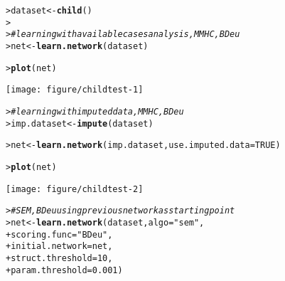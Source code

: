 \documentclass{article}\usepackage[]{graphicx}\usepackage[]{color}
\makeatletter
\def\maxwidth{ %
  \ifdim\Gin@nat@width>\linewidth
    \linewidth
  \else
    \Gin@nat@width
  \fi
}
\newcommand{\hlnum}[1]{\textcolor[rgb]{0.686,0.059,0.569}{#1}}%
\newcommand{\hlstr}[1]{\textcolor[rgb]{0.192,0.494,0.8}{#1}}%
\newcommand{\hlcom}[1]{\textcolor[rgb]{0.678,0.584,0.686}{\textit{#1}}}%
\newcommand{\hlstd}[1]{\textcolor[rgb]{0.345,0.345,0.345}{#1}}%
\newcommand{\hlkwb}[1]{\textcolor[rgb]{0.69,0.353,0.396}{#1}}%
\newcommand{\hlkwc}[1]{\textcolor[rgb]{0.333,0.667,0.333}{#1}}%
\newcommand{\hlkwd}[1]{\textcolor[rgb]{0.737,0.353,0.396}{\textbf{#1}}}%
\newenvironment{kframe}{%
 \def\at@end@of@kframe{}%
 \ifinner\ifhmode%
  \def\at@end@of@kframe{\end{minipage}}%
  \begin{minipage}{\columnwidth}%
 \fi\fi%
 \def\FrameCommand##1{\hskip\@totalleftmargin \hskip-\fboxsep
 \colorbox{shadecolor}{##1}\hskip-\fboxsep
     \hskip-\linewidth \hskip-\@totalleftmargin \hskip\columnwidth}%
 \MakeFramed {\advance\hsize-\width
   \@totalleftmargin\z@ \linewidth\hsize
   \@setminipage}}%
 {\par\unskip\endMakeFramed%
 \at@end@of@kframe}
\newenvironment{knitrout}{}{} %
\makeatother
\begin{document}
\begin{knitrout}
\color{fgcolor}\begin{kframe}
\begin{alltt}
\hlstd{> }\hlstd{dataset} \hlkwb{<-} \hlkwd{child}\hlstd{()}
\hlstd{> }
\hlstd{> }\hlcom{# learning with available cases analysis, MMHC, BDeu}
\hlstd{> }\hlstd{net} \hlkwb{<-} \hlkwd{learn.network}\hlstd{(dataset)}
\end{alltt}


{\ttfamily\noindent\itshape\color{messagecolor}{bnstruct :: learning the structure using MMHC ...\\bnstruct :: learning using MMHC completed.\\bnstruct :: learning network parameters ... \\bnstruct :: parameter learning done.}}\begin{alltt}
\hlstd{> }\hlkwd{plot}\hlstd{(net)}
\end{alltt}
\end{kframe}
\texttt{[image: figure/childtest-1]} 
\begin{kframe}\begin{alltt}
\hlstd{> }\hlcom{# learning with imputed data, MMHC, BDeu}
\hlstd{> }\hlstd{imp.dataset} \hlkwb{<-} \hlkwd{impute}\hlstd{(dataset)}
\end{alltt}


{\ttfamily\noindent\itshape\color{messagecolor}{bnstruct :: performing imputation ...\\bnstruct :: imputation finished.}}\begin{alltt}
\hlstd{> }\hlstd{net} \hlkwb{<-} \hlkwd{learn.network}\hlstd{(imp.dataset,} \hlkwc{use.imputed.data} \hlstd{=} \hlnum{TRUE}\hlstd{)}
\end{alltt}


{\ttfamily\noindent\itshape\color{messagecolor}{bnstruct :: learning the structure using MMHC ...\\bnstruct :: learning using MMHC completed.\\bnstruct :: learning network parameters ... \\bnstruct :: parameter learning done.}}\begin{alltt}
\hlstd{> }\hlkwd{plot}\hlstd{(net)}
\end{alltt}
\end{kframe}
\texttt{[image: figure/childtest-2]} 
\begin{kframe}\begin{alltt}
\hlstd{> }\hlcom{# SEM, BDeu using previous network as starting point}
\hlstd{> }\hlstd{net} \hlkwb{<-} \hlkwd{learn.network}\hlstd{(dataset,} \hlkwc{algo} \hlstd{=} \hlstr{"sem"}\hlstd{,}
\hlstd{+ }                     \hlkwc{scoring.func} \hlstd{=} \hlstr{"BDeu"}\hlstd{,}
\hlstd{+ }                     \hlkwc{initial.network} \hlstd{= net,}
\hlstd{+ }                     \hlkwc{struct.threshold} \hlstd{=} \hlnum{10}\hlstd{,}
\hlstd{+ }                     \hlkwc{param.threshold} \hlstd{=} \hlnum{0.001}\hlstd{)}
\end{alltt}



\end{kframe}
\end{knitrout}
\end{document}
